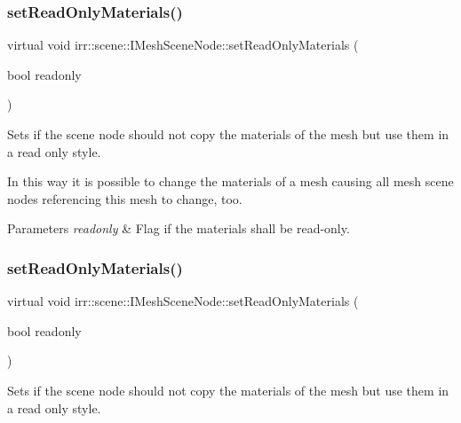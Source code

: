 \subsubsection{\texorpdfstring{set\+Read\+Only\+Materials()}{setReadOnlyMaterials()}\hspace{0.1cm}{\footnotesize\ttfamily [1/2]}}
{\footnotesize\ttfamily virtual void irr\+::scene\+::\+I\+Mesh\+Scene\+Node\+::set\+Read\+Only\+Materials (\begin{DoxyParamCaption}\item[{bool}]{readonly }\end{DoxyParamCaption})\hspace{0.3cm}{\ttfamily [pure virtual]}}



Sets if the scene node should not copy the materials of the mesh but use them in a read only style. 

In this way it is possible to change the materials of a mesh causing all mesh scene nodes referencing this mesh to change, too. 
\begin{DoxyParams}{Parameters}
{\em readonly} & Flag if the materials shall be read-\/only. \\
\hline
\end{DoxyParams}
\mbox{\label{classirr_1_1scene_1_1IMeshSceneNode_a3bae73b4f7b1a6b265a62ece964c008f}} 
\subsubsection{\texorpdfstring{set\+Read\+Only\+Materials()}{setReadOnlyMaterials()}\hspace{0.1cm}{\footnotesize\ttfamily [2/2]}}
{\footnotesize\ttfamily virtual void irr\+::scene\+::\+I\+Mesh\+Scene\+Node\+::set\+Read\+Only\+Materials (\begin{DoxyParamCaption}\item[{bool}]{readonly }\end{DoxyParamCaption})\hspace{0.3cm}{\ttfamily [pure virtual]}}



Sets if the scene node should not copy the materials of the mesh but use them in a read only style. 

